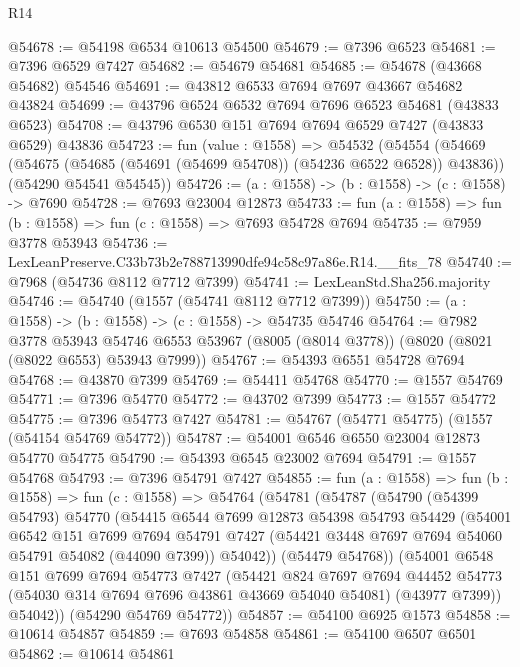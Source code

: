 \begin{lexlean}{R14}
\begin{coremodule}
@54678 := @54198 @6534 @10613 @54500
@54679 := @7396 @6523
@54681 := @7396 @6529 @7427
@54682 := @54679 @54681
@54685 := @54678 (@43668 @54682) @54546
@54691 := @43812 @6533 @7694 @7697 @43667 @54682 @43824
@54699 := @43796 @6524 @6532 @7694 @7696 @6523 @54681 (@43833 @6523)
@54708 := @43796 @6530 @151 @7694 @7694 @6529 @7427 (@43833 @6529) @43836
@54723 := fun (value : @1558) =>
  @54532
    (@54554
      (@54669 (@54675 (@54685 (@54691 (@54699 @54708)) (@54236 @6522 @6528)) @43836))
      (@54290 @54541 @54545))
@54726 := (a : @1558) -> (b : @1558) -> (c : @1558) -> @7690
@54728 := @7693 @23004 @12873
@54733 := fun (a : @1558) => fun (b : @1558) => fun (c : @1558) => @7693 @54728 @7694
@54735 := @7959 @3778 @53943
@54736 := LexLeanPreserve.C33b73b2e788713990dfe94c58c97a86e.R14.__fits_78
@54740 := @7968 (@54736 @8112 @7712 @7399)
@54741 := LexLeanStd.Sha256.majority
@54746 := @54740 (@1557 (@54741 @8112 @7712 @7399))
@54750 := (a : @1558) -> (b : @1558) -> (c : @1558) -> @54735 @54746
@54764 := @7982
    @3778
    @53943
    @54746
    @6553
    @53967
    (@8005 (@8014 @3778))
    (@8020 (@8021 (@8022 @6553) @53943 @7999))
@54767 := @54393 @6551 @54728 @7694
@54768 := @43870 @7399
@54769 := @54411 @54768
@54770 := @1557 @54769
@54771 := @7396 @54770
@54772 := @43702 @7399
@54773 := @1557 @54772
@54775 := @7396 @54773 @7427
@54781 := @54767 (@54771 @54775) (@1557 (@54154 @54769 @54772))
@54787 := @54001 @6546 @6550 @23004 @12873 @54770 @54775
@54790 := @54393 @6545 @23002 @7694
@54791 := @1557 @54768
@54793 := @7396 @54791 @7427
@54855 := fun (a : @1558) =>
  fun (b : @1558) =>
  fun (c : @1558) =>
  @54764
    (@54781
      (@54787
        (@54790
          (@54399 @54793)
          @54770
          (@54415
            @6544
            @7699
            @12873
            @54398
            @54793
            @54429
            (@54001
              @6542
              @151
              @7699
              @7694
              @54791
              @7427
              (@54421 @3448 @7697 @7694 @54060 @54791 @54082 (@44090 @7399))
              @54042))
          (@54479 @54768))
        (@54001
          @6548
          @151
          @7699
          @7694
          @54773
          @7427
          (@54421
            @824
            @7697
            @7694
            @44452
            @54773
            (@54030 @314 @7694 @7696 @43861 @43669 @54040 @54081)
            (@43977 @7399))
          @54042))
      (@54290 @54769 @54772))
@54857 := @54100 @6925 @1573
@54858 := @10614 @54857
@54859 := @7693 @54858
@54861 := @54100 @6507 @6501
@54862 := @10614 @54861

\end{coremodule}
\end{lexlean}
